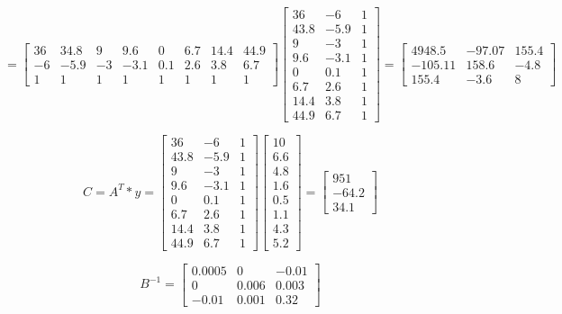 \documentclass[a4paper,norsk]{article}
\begin{document}
\begin{equation*}
= \begin{bmatrix}36 & 34.8 & 9 & 9.6 & 0 & 6.7&14.4&44.9\\ -6 & -5.9 &-3&-3.1&0.1&2.6&3.8&6.7\\1 & 1 & 1 & 1& 1 & 1 & 1 & 1\end{bmatrix}
\begin{bmatrix}36 & -6 & 1 \\ 43.8 & -5.9 & 1 \\9 & -3 & 1 \\ 9.6 & -3.1 & 1 \\0 & 0.1 & 1 \\6.7& 2.6 & 1 \\14.4 & 3.8 & 1 \\ 44.9 & 6.7 & 1\end{bmatrix}
=\begin{bmatrix}4948.5 & -97.07 & 155.4 \\ -105.11 & 158.6 & -4.8 \\ 155.4 & -3.6 & 8\end{bmatrix}
\end{equation*} 

\begin{equation*}
C = A^{T} * y = \begin{bmatrix}36 & -6 & 1 \\ 43.8 & -5.9 & 1 \\9 & -3 & 1 \\ 9.6 & -3.1 & 1 \\0 & 0.1 & 1 \\6.7& 2.6 & 1 \\14.4 & 3.8 & 1 \\ 44.9 & 6.7 & 1 \end{bmatrix}
\begin{bmatrix}10 \\ 6.6\\4.8\\1.6\\0.5\\1.1\\4.3\\5.2\end{bmatrix}
=\begin{bmatrix} 951 \\ -64.2 \\ 34.1 \end{bmatrix}
\end{equation*}

\begin{equation*}
B^{-1} = \begin{bmatrix} 0.0005  & 0 & -0.01\\ 0 & 0.006 & 0.003 \\ -0.01 & 0.001 & 0.32 \end{bmatrix}
\end{equation*}
\end{document}
